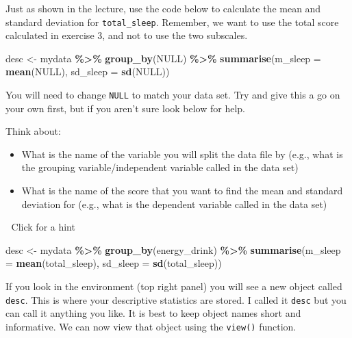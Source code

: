 \documentclass[
]{book}
\newenvironment{Shaded}{\begin{snugshade}}{\end{snugshade}}
\newcommand{\AttributeTok}[1]{\textcolor[rgb]{0.13,0.29,0.53}{#1}}
\newcommand{\ConstantTok}[1]{\textcolor[rgb]{0.56,0.35,0.01}{#1}}
\newcommand{\FunctionTok}[1]{\textcolor[rgb]{0.13,0.29,0.53}{\textbf{#1}}}
\newcommand{\NormalTok}[1]{#1}
\newcommand{\OtherTok}[1]{\textcolor[rgb]{0.56,0.35,0.01}{#1}}
\newcommand{\SpecialCharTok}[1]{\textcolor[rgb]{0.81,0.36,0.00}{\textbf{#1}}}
\begin{document}
Just as shown in the lecture, use the code below to calculate the mean and standard deviation for \texttt{total\_sleep}. Remember, we want to use the total score calculated in exercise 3, and not to use the two subscales.

\begin{Shaded}
\begin{Highlighting}[]
\NormalTok{desc }\OtherTok{\textless{}{-}}\NormalTok{  mydata }\SpecialCharTok{\%\textgreater{}\%}
  \FunctionTok{group\_by}\NormalTok{(}\ConstantTok{NULL}\NormalTok{) }\SpecialCharTok{\%\textgreater{}\%}
  \FunctionTok{summarise}\NormalTok{(}\AttributeTok{m\_sleep =} \FunctionTok{mean}\NormalTok{(}\ConstantTok{NULL}\NormalTok{),}
            \AttributeTok{sd\_sleep =} \FunctionTok{sd}\NormalTok{(}\ConstantTok{NULL}\NormalTok{))}
\end{Highlighting}
\end{Shaded}

You will need to change \texttt{NULL} to match your data set. Try and give this a go on your own first, but if you aren't sure look below for help.

Think about:

\begin{itemize}
\item
  What is the name of the variable you will split the data file by (e.g., what is the grouping variable/independent variable called in the data set)
\item
  What is the name of the score that you want to find the mean and standard deviation for (e.g., what is the dependent variable called in the data set)
\end{itemize}

👀 Click for a hint

\begin{Shaded}
\begin{Highlighting}[]
\NormalTok{desc }\OtherTok{\textless{}{-}}\NormalTok{  mydata }\SpecialCharTok{\%\textgreater{}\%}
  \FunctionTok{group\_by}\NormalTok{(energy\_drink) }\SpecialCharTok{\%\textgreater{}\%}
  \FunctionTok{summarise}\NormalTok{(}\AttributeTok{m\_sleep =} \FunctionTok{mean}\NormalTok{(total\_sleep),}
            \AttributeTok{sd\_sleep =} \FunctionTok{sd}\NormalTok{(total\_sleep))}
\end{Highlighting}
\end{Shaded}

If you look in the environment (top right panel) you will see a new object called \texttt{desc}. This is where your descriptive statistics are stored. I called it \texttt{desc} but you can call it anything you like. It is best to keep object names short and informative. We can now view that object using the \texttt{view()} function.
\end{document}
